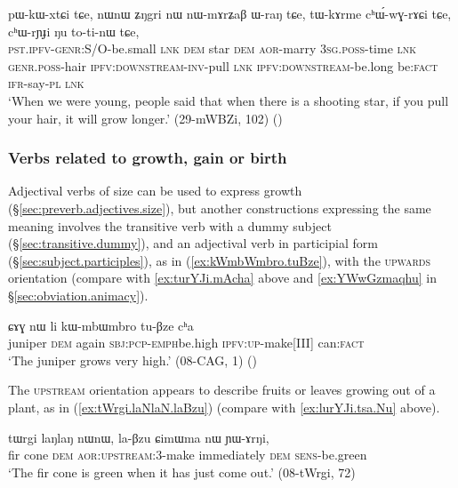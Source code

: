 \begin{exe}
\ex \label{ex:tWkArme.chWrYi}
\gll pɯ-kɯ-xtɕi tɕe, nɯnɯ ʑŋgri nɯ nɯ-mɤrʑaβ ɯ-raŋ tɕe, tɯ-kɤrme cʰɯ́-wɣ-rɤɕi tɕe, cʰɯ-rɲɟi ŋu to-ti-nɯ tɕe,\\
\textsc{pst}.\textsc{ipfv}-\textsc{genr}:S/O-be.small \textsc{lnk} \textsc{dem} star \textsc{dem}  \textsc{aor}-marry \textsc{3sg}.\textsc{poss}-time \textsc{lnk} \textsc{genr}.\textsc{poss}-hair \textsc{ipfv}:\textsc{downstream}-\textsc{inv}-pull \textsc{lnk} \textsc{ipfv}:\textsc{downstream}-be.long be:\textsc{fact} \textsc{ifr}-say-\textsc{pl} \textsc{lnk} \\
\glt `When we were young, people said that when there is a shooting star, if you pull your hair, it will grow longer.' (29-mWBZi, 102)
()
 \end{exe}

\subsubsection{Verbs related to growth, gain or birth} \label{sec:preverb.gain}
Adjectival verbs of size can be used to express growth (§\ref{sec:preverb.adjectives.size}), but another constructions expressing the same meaning involves the transitive verb  with a dummy subject (§\ref{sec:transitive.dummy}), and an adjectival verb in participial form (§\ref{sec:subject.participles}), as in (\ref{ex:kWmbWmbro.tuBze}), with the \textsc{upwards} orientation (compare with \ref{ex:turYJi.mAcha} above and \ref{ex:YWwGzmaqhu} in §\ref{sec:obviation.animacy}).
 

\begin{exe}
\ex \label{ex:kWmbWmbro.tuBze}
\gll ɕɤɣ nɯ li kɯ-mbɯ\redp{}mbro tu-βze cʰa \\
juniper \textsc{dem} again \textsc{sbj}:\textsc{pcp}-\textsc{emph}\redp{}be.high \textsc{ipfv}:\textsc{up}-make[III] can:\textsc{fact} \\
\glt `The juniper grows very high.' (08-CAG, 1) ()
 \end{exe}
 
The \textsc{upstream} orientation appears to describe fruits or leaves growing out of a plant, as in (\ref{ex:tWrgi.laNlaN.laBzu})  (compare with \ref{ex:lurYJi.tsa.Nu} above).
 
 \begin{exe}
\ex \label{ex:tWrgi.laNlaN.laBzu}
\gll  tɯrgi laŋlaŋ nɯnɯ, la-βzu ɕimɯma nɯ ɲɯ-ɤrŋi, \\
fir cone \textsc{dem} \textsc{aor}:\textsc{upstream}:3\flobv{}-make immediately \textsc{dem} \textsc{sens}-be.green \\
\glt `The fir cone is green when it has just come out.' (08-tWrgi, 72)
  \end{exe}

